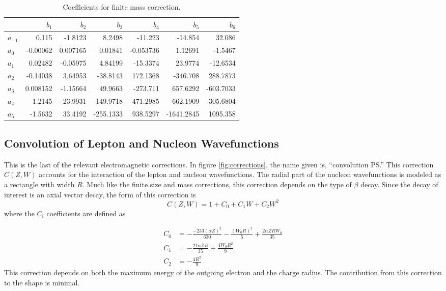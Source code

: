 \documentclass[../MaxHughesThesis.tex]{subfiles}
\begin{document}
\begin{table}[!hbt]
	\centering
	\caption{Coefficients for finite mass correction.}
		\begin{tabular}{lrrrrrr}
		         & $b_{1}$ & $b_{2}$ & $b_{3}$ & $b_{4}$ & $b_{5}$ & $b_{6}$ \\ \hline
		$a_{-1}$ & 0.115 & -1.8123 & 8.2498 & -11.223 & -14.854 & 32.086 \\
		$a_{0}$  & -0.00062 & 0.007165 & 0.01841 & -0.053736 & 1.12691 & -1.5467 \\
		$a_{1}$  & 0.02482 & -0.05975 & 4.84199 & -15.3374 & 23.9774 & -12.6534 \\
		$a_{2}$  & -0.14038 & 3.64953 & -38.8143 & 172.1368 & -346.708 & 288.7873 \\
		$a_{3}$  & 0.008152 & -1.15664 & 49.9663 & -273.711 & 657.6292 & -603.7033 \\
		$a_{4}$  & 1.2145 & -23.9931 & 149.9718 & -471.2985 & 662.1909 & -305.6804 \\
		$a_{5}$  & -1.5632 & 33.4192 & -255.1333 & 938.5297 & -1641.2845 & 1095.358 
		\end{tabular}
	\label{tab:bcoef}
\end{table}

\subsection{Convolution of Lepton and Nucleon Wavefunctions}

This is the last of the relevant electromagnetic corrections.
In figure \ref{fig:corrections}, the name given is, ``convolution PS.''
This correction $C(Z,W)$ accounts for the interaction of the lepton and nucleon wavefunctions. 
The radial part of the nucleon wavefunctions is  modeled as a rectangle with width $R$.
Much like the finite size and mass corrections, this correction depends on the type of $\beta$ decay.
Since the decay of interest is an axial vector decay, the form of this correction is %
\begin{equation}
	C(Z,W) = 1 + C_{0} + C_{1} W + C_{2} W^{2}
	\label{eq:nucandlepconv}
\end{equation}
where the $C_{i}$ coefficients are defined as \cite{WIL90} %

\begin{equation}
	\label{eq:csconvocorrection}
	\begin{split}
	C_{0} & = -\frac{-233(\alpha Z)^{2}}{630} - \frac{(W_{0} R)^{2}}{5} + \frac{2 \alpha Z R W_{0}}{35} \\
	C_{1} & = -\frac{21 \alpha Z R}{35} + \frac{4 W_{0} R^{2}}{9} \\
	C_{2} & = -\frac{4 R^{2}}{9}
	\end{split}
\end{equation}
This correction depends on both the maximum energy of the outgoing electron and the charge radius.
The contribution from this correction to the shape is minimal. 
\end{document}
